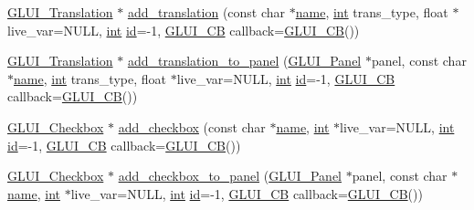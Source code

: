\begin{DoxyCompactItemize}
\item 
\hyperlink{class_g_l_u_i___translation}{G\+L\+U\+I\+\_\+\+Translation} $\ast$ \hyperlink{class_g_l_u_i_a627ddf622951e9d00e5804922ab76032}{add\+\_\+translation} (const char $\ast$\hyperlink{glext_8h_ad977737dfc9a274a62741b9500c49a32}{name}, \hyperlink{wglext_8h_a500a82aecba06f4550f6849b8099ca21}{int} trans\+\_\+type, float $\ast$live\+\_\+var=N\+U\+L\+L, \hyperlink{wglext_8h_a500a82aecba06f4550f6849b8099ca21}{int} \hyperlink{glext_8h_a58c2a664503e14ffb8f21012aabff3e9}{id}=-\/1, \hyperlink{class_g_l_u_i___c_b}{G\+L\+U\+I\+\_\+\+C\+B} callback=\hyperlink{class_g_l_u_i___c_b}{G\+L\+U\+I\+\_\+\+C\+B}())
\item 
\hyperlink{class_g_l_u_i___translation}{G\+L\+U\+I\+\_\+\+Translation} $\ast$ \hyperlink{class_g_l_u_i_a5919dbd7390b1566659edfa21e2db758}{add\+\_\+translation\+\_\+to\+\_\+panel} (\hyperlink{class_g_l_u_i___panel}{G\+L\+U\+I\+\_\+\+Panel} $\ast$panel, const char $\ast$\hyperlink{glext_8h_ad977737dfc9a274a62741b9500c49a32}{name}, \hyperlink{wglext_8h_a500a82aecba06f4550f6849b8099ca21}{int} trans\+\_\+type, float $\ast$live\+\_\+var=N\+U\+L\+L, \hyperlink{wglext_8h_a500a82aecba06f4550f6849b8099ca21}{int} \hyperlink{glext_8h_a58c2a664503e14ffb8f21012aabff3e9}{id}=-\/1, \hyperlink{class_g_l_u_i___c_b}{G\+L\+U\+I\+\_\+\+C\+B} callback=\hyperlink{class_g_l_u_i___c_b}{G\+L\+U\+I\+\_\+\+C\+B}())
\item 
\hyperlink{class_g_l_u_i___checkbox}{G\+L\+U\+I\+\_\+\+Checkbox} $\ast$ \hyperlink{class_g_l_u_i_ac72e36bbd637e4832f1e2f8b1e5c2e19}{add\+\_\+checkbox} (const char $\ast$\hyperlink{glext_8h_ad977737dfc9a274a62741b9500c49a32}{name}, \hyperlink{wglext_8h_a500a82aecba06f4550f6849b8099ca21}{int} $\ast$live\+\_\+var=N\+U\+L\+L, \hyperlink{wglext_8h_a500a82aecba06f4550f6849b8099ca21}{int} \hyperlink{glext_8h_a58c2a664503e14ffb8f21012aabff3e9}{id}=-\/1, \hyperlink{class_g_l_u_i___c_b}{G\+L\+U\+I\+\_\+\+C\+B} callback=\hyperlink{class_g_l_u_i___c_b}{G\+L\+U\+I\+\_\+\+C\+B}())
\item 
\hyperlink{class_g_l_u_i___checkbox}{G\+L\+U\+I\+\_\+\+Checkbox} $\ast$ \hyperlink{class_g_l_u_i_ace92f3923a991af8e371c3c1e7ec4f5b}{add\+\_\+checkbox\+\_\+to\+\_\+panel} (\hyperlink{class_g_l_u_i___panel}{G\+L\+U\+I\+\_\+\+Panel} $\ast$panel, const char $\ast$\hyperlink{glext_8h_ad977737dfc9a274a62741b9500c49a32}{name}, \hyperlink{wglext_8h_a500a82aecba06f4550f6849b8099ca21}{int} $\ast$live\+\_\+var=N\+U\+L\+L, \hyperlink{wglext_8h_a500a82aecba06f4550f6849b8099ca21}{int} \hyperlink{glext_8h_a58c2a664503e14ffb8f21012aabff3e9}{id}=-\/1, \hyperlink{class_g_l_u_i___c_b}{G\+L\+U\+I\+\_\+\+C\+B} callback=\hyperlink{class_g_l_u_i___c_b}{G\+L\+U\+I\+\_\+\+C\+B}())

\end{DoxyCompactItemize}
